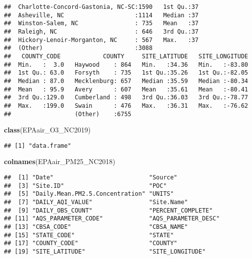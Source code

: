 \documentclass[]{article}
\newenvironment{Shaded}{\begin{snugshade}}{\end{snugshade}}
\newcommand{\KeywordTok}[1]{\textcolor[rgb]{0.13,0.29,0.53}{\textbf{#1}}}
\newcommand{\NormalTok}[1]{#1}
\begin{document}
\begin{verbatim}
##  Charlotte-Concord-Gastonia, NC-SC:1590   1st Qu.:37                         
##  Asheville, NC                    :1114   Median :37                         
##  Winston-Salem, NC                : 735   Mean   :37                         
##  Raleigh, NC                      : 646   3rd Qu.:37                         
##  Hickory-Lenoir-Morganton, NC     : 567   Max.   :37                         
##  (Other)                          :3088                                      
##   COUNTY_CODE            COUNTY     SITE_LATITUDE   SITE_LONGITUDE  
##  Min.   :  3.0   Haywood    : 864   Min.   :34.36   Min.   :-83.80  
##  1st Qu.: 63.0   Forsyth    : 735   1st Qu.:35.26   1st Qu.:-82.05  
##  Median : 87.0   Mecklenburg: 657   Median :35.59   Median :-80.34  
##  Mean   : 95.9   Avery      : 607   Mean   :35.61   Mean   :-80.41  
##  3rd Qu.:129.0   Cumberland : 498   3rd Qu.:36.03   3rd Qu.:-78.77  
##  Max.   :199.0   Swain      : 476   Max.   :36.31   Max.   :-76.62  
##                  (Other)    :6755
\end{verbatim}

\begin{Shaded}
\begin{Highlighting}[]
\KeywordTok{class}\NormalTok{(EPAair_O3_NC2019)}
\end{Highlighting}
\end{Shaded}

\begin{verbatim}
## [1] "data.frame"
\end{verbatim}

\begin{Shaded}
\begin{Highlighting}[]
\KeywordTok{colnames}\NormalTok{(EPAair_PM25_NC2018)}
\end{Highlighting}
\end{Shaded}

\begin{verbatim}
##  [1] "Date"                           "Source"                        
##  [3] "Site.ID"                        "POC"                           
##  [5] "Daily.Mean.PM2.5.Concentration" "UNITS"                         
##  [7] "DAILY_AQI_VALUE"                "Site.Name"                     
##  [9] "DAILY_OBS_COUNT"                "PERCENT_COMPLETE"              
## [11] "AQS_PARAMETER_CODE"             "AQS_PARAMETER_DESC"            
## [13] "CBSA_CODE"                      "CBSA_NAME"                     
## [15] "STATE_CODE"                     "STATE"                         
## [17] "COUNTY_CODE"                    "COUNTY"                        
## [19] "SITE_LATITUDE"                  "SITE_LONGITUDE"
\end{verbatim}
\end{document}
